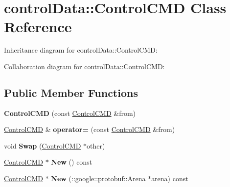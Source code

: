 \hypertarget{classcontrol_data_1_1_control_c_m_d}{}\section{control\+Data\+:\+:Control\+C\+MD Class Reference}
\label{classcontrol_data_1_1_control_c_m_d}


Inheritance diagram for control\+Data\+:\+:Control\+C\+MD\+:


Collaboration diagram for control\+Data\+:\+:Control\+C\+MD\+:
\subsection*{Public Member Functions}
\begin{DoxyCompactItemize}
\item 
\mbox{\label{classcontrol_data_1_1_control_c_m_d_a0565b20307bd1266ca1830deb048f39e}} 
{\bfseries Control\+C\+MD} (const \hyperlink{classcontrol_data_1_1_control_c_m_d}{Control\+C\+MD} \&from)
\item 
\mbox{\label{classcontrol_data_1_1_control_c_m_d_ae509f1a45c5339b89dd52ef7a25ab209}} 
\hyperlink{classcontrol_data_1_1_control_c_m_d}{Control\+C\+MD} \& {\bfseries operator=} (const \hyperlink{classcontrol_data_1_1_control_c_m_d}{Control\+C\+MD} \&from)
\item 
\mbox{\label{classcontrol_data_1_1_control_c_m_d_aa790d79191d54f2b738f8ba21db7d870}} 
void {\bfseries Swap} (\hyperlink{classcontrol_data_1_1_control_c_m_d}{Control\+C\+MD} $\ast$other)
\item 
\mbox{\label{classcontrol_data_1_1_control_c_m_d_a70ab0ecf4527367ac30b00c2d8ae135c}} 
\hyperlink{classcontrol_data_1_1_control_c_m_d}{Control\+C\+MD} $\ast$ {\bfseries New} () const
\item 
\mbox{\label{classcontrol_data_1_1_control_c_m_d_a7984ef2833843a7d70a661e614dcbf3b}} 
\hyperlink{classcontrol_data_1_1_control_c_m_d}{Control\+C\+MD} $\ast$ {\bfseries New} (\+::google\+::protobuf\+::\+Arena $\ast$arena) const
\item 

\end{DoxyCompactItemize}
